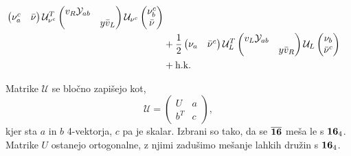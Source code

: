 \begin{align}
\begin{pmatrix}
		\nu^c_a &\bar{\nu}
	\end{pmatrix} \mathcal{U}^T_{\nu^c} \begin{pmatrix}
		v_R \mathcal{Y}_{ab} & \\
		& y \bar{v}_L
	\end{pmatrix} \mathcal{U}_{\nu^c} \begin{pmatrix}
		\nu^c_b \\ \bar{\nu}
	\end{pmatrix} \notag \\
	&+ \frac{1}{2}\begin{pmatrix}
		\nu_a & \bar{\nu}^c
	\end{pmatrix} \mathcal{U}^T_{L} \begin{pmatrix}
		v_L \mathcal{Y}_{ab} & \\
		& y \bar{v}_R
	\end{pmatrix} \mathcal{U}_L \begin{pmatrix}
		\nu_b \\ \bar{\nu}^c
	\end{pmatrix} \notag \\
	&+ \text{h.k.}
\end{align}

Matrike $\mathcal{U}$ se bločno zapišejo kot,
\begin{equation}
	\mathcal{U} = \begin{pmatrix}
		U & a \\ b^T & c
	\end{pmatrix},
\end{equation}
kjer sta $a$ in $b$ 4-vektorja, $c$ pa je skalar. Izbrani so tako, da se $\overline{\mathbf{16}}$ meša le s 
$\mathbf{16}_4$. Matrike $U$ ostanejo ortogonalne, z njimi zadušimo mešanje lahkih družin s $\mathbf{16}_4$.

